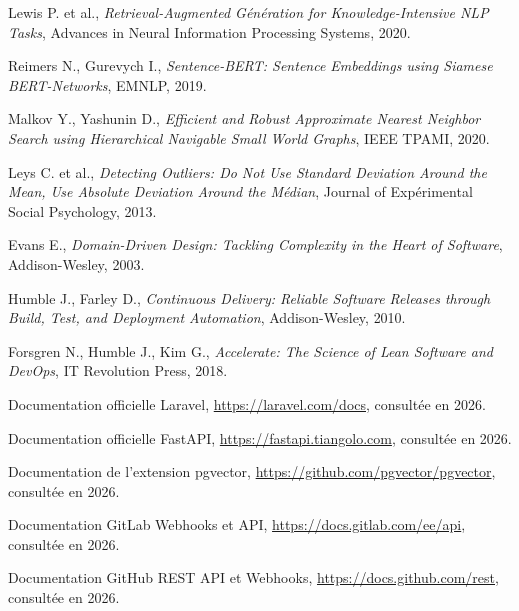 \documentclass[12pt,a4paper,oneside]{report}
\begin{document}
\begin{enumerate}[label={[\arabic*]},leftmargin=*]
\item Lewis P. et al., \textit{Retrieval-Augmented Génération for Knowledge-Intensive NLP Tasks}, Advances in Neural Information Processing Systems, 2020.
\item Reimers N., Gurevych I., \textit{Sentence-BERT: Sentence Embeddings using Siamese BERT-Networks}, EMNLP, 2019.
\item Malkov Y., Yashunin D., \textit{Efficient and Robust Approximate Nearest Neighbor Search using Hierarchical Navigable Small World Graphs}, IEEE TPAMI, 2020.
\item Leys C. et al., \textit{Detecting Outliers: Do Not Use Standard Deviation Around the Mean, Use Absolute Deviation Around the Médian}, Journal of Expérimental Social Psychology, 2013.
\item Evans E., \textit{Domain-Driven Design: Tackling Complexity in the Heart of Software}, Addison-Wesley, 2003.
\item Humble J., Farley D., \textit{Continuous Delivery: Reliable Software Releases through Build, Test, and Deployment Automation}, Addison-Wesley, 2010.
\item Forsgren N., Humble J., Kim G., \textit{Accelerate: The Science of Lean Software and DevOps}, IT Revolution Press, 2018.
\item Documentation officielle Laravel, \url{https://laravel.com/docs}, consultée en 2026.
\item Documentation officielle FastAPI, \url{https://fastapi.tiangolo.com}, consultée en 2026.
\item Documentation de l'extension pgvector, \url{https://github.com/pgvector/pgvector}, consultée en 2026.
\item Documentation GitLab Webhooks et API, \url{https://docs.gitlab.com/ee/api}, consultée en 2026.
\item Documentation GitHub REST API et Webhooks, \url{https://docs.github.com/rest}, consultée en 2026.
\end{enumerate}
\end{document}

